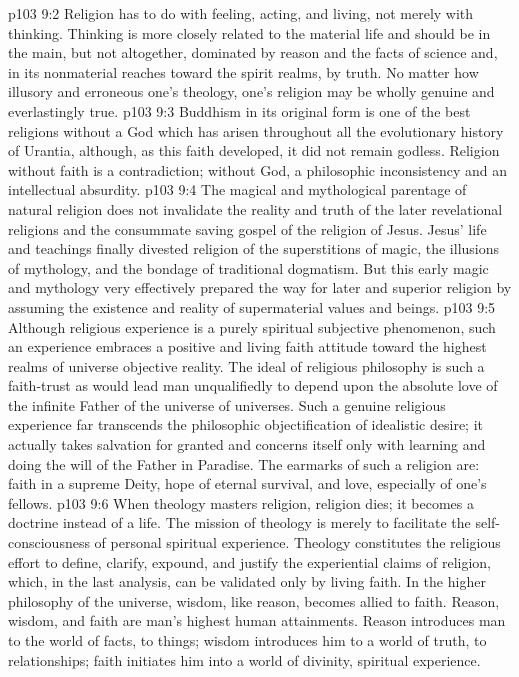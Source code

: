 \vs p103 9:2 Religion has to do with feeling, acting, and living, not merely with thinking. Thinking is more closely related to the material life and should be in the main, but not altogether, dominated by reason and the facts of science and, in its nonmaterial reaches toward the spirit realms, by truth. No matter how illusory and erroneous one’s theology, one’s religion may be wholly genuine and everlastingly true.
\vs p103 9:3 Buddhism in its original form is one of the best religions without a God which has arisen throughout all the evolutionary history of Urantia, although, as this faith developed, it did not remain godless. Religion without faith is a contradiction; without God, a philosophic inconsistency and an intellectual absurdity.
\vs p103 9:4 The magical and mythological parentage of natural religion does not invalidate the reality and truth of the later revelational religions and the consummate saving gospel of the religion of Jesus. Jesus’ life and teachings finally divested religion of the superstitions of magic, the illusions of mythology, and the bondage of traditional dogmatism. But this early magic and mythology very effectively prepared the way for later and superior religion by assuming the existence and reality of supermaterial values and beings.
\vs p103 9:5 Although religious experience is a purely spiritual subjective phenomenon, such an experience embraces a positive and living faith attitude toward the highest realms of universe objective reality. The ideal of religious philosophy is such a faith\hyp{}trust as would lead man unqualifiedly to depend upon the absolute love of the infinite Father of the universe of universes. Such a genuine religious experience far transcends the philosophic objectification of idealistic desire; it actually takes salvation for granted and concerns itself only with learning and doing the will of the Father in Paradise. The earmarks of such a religion are: faith in a supreme Deity, hope of eternal survival, and love, especially of one’s fellows.
\vs p103 9:6 \pc When theology masters religion, religion dies; it becomes a doctrine instead of a life. The mission of theology is merely to facilitate the self\hyp{}consciousness of personal spiritual experience. Theology constitutes the religious effort to define, clarify, expound, and justify the experiential claims of religion, which, in the last analysis, can be validated only by living faith. In the higher philosophy of the universe, wisdom, like reason, becomes allied to faith. Reason, wisdom, and faith are man’s highest human attainments. Reason introduces man to the world of facts, to things; wisdom introduces him to a world of truth, to relationships; faith initiates him into a world of divinity, spiritual experience.

